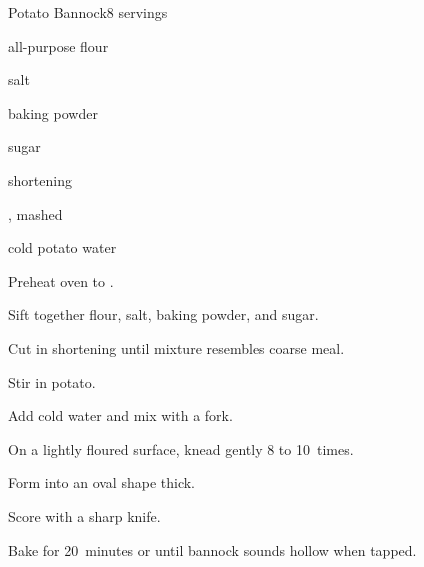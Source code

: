 \begin{recipe}{Potato Bannock}{}{8 servings}

\begin{ingredients}
\item \C{2\third} all-purpose flour
\item {} salt
\item {} baking powder
\item {} sugar
\item {} shortening
\item \C{\threequarter} , mashed
\item {} cold potato water
\end{ingredients}

\begin{directions}
\item Preheat oven to .
\item Sift together flour, salt, baking powder, and sugar.
\item Cut in shortening until mixture resembles coarse meal.
\item Stir in potato.
\item Add cold water and mix with a fork.
\item On a lightly floured surface, knead gently 8 to 10~times.
\item Form into an oval shape \inch{\threequarter} thick.
\item Score with a sharp knife.
\item Bake for 20~minutes or until bannock sounds hollow when tapped.  
\end{directions}

\end{recipe}
